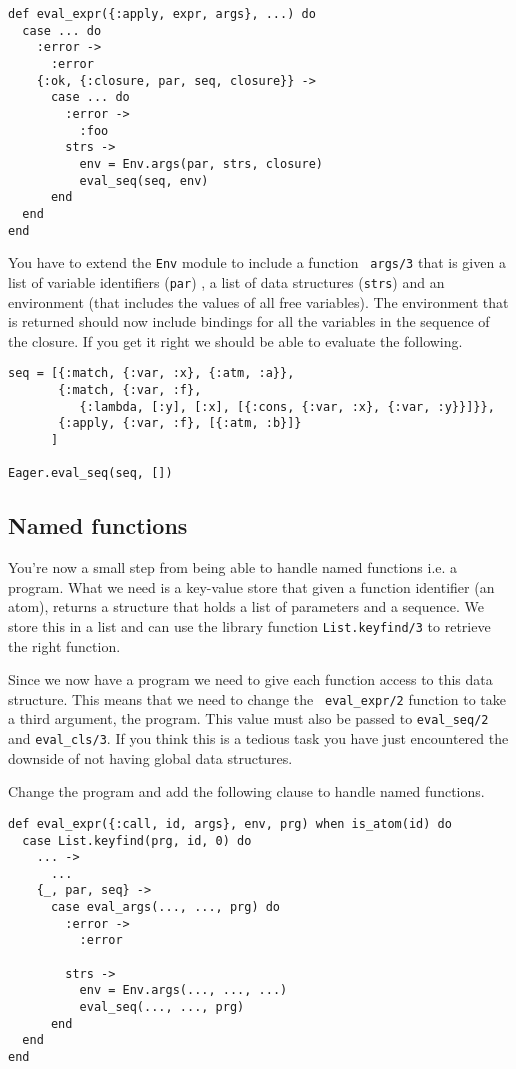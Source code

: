 \documentclass[a4paper,11pt]{article}
\begin{document}
\begin{verbatim}
def eval_expr({:apply, expr, args}, ...) do
  case ... do
    :error ->
      :error
    {:ok, {:closure, par, seq, closure}} ->
      case ... do
        :error ->
          :foo
        strs ->
          env = Env.args(par, strs, closure)
          eval_seq(seq, env)
      end
  end
end
\end{verbatim}

You have to extend the {\tt Env} module to include a function {\tt
  args/3} that is given a list of variable identifiers ({\tt par}) , a
list of data structures ({\tt strs}) and an environment (that includes
the values of all free variables). The environment that is returned
should now include bindings for all the variables in the sequence of
the closure. If you get it right we should be able to evaluate the
following.

\begin{verbatim}
seq = [{:match, {:var, :x}, {:atm, :a}},
       {:match, {:var, :f}, 
          {:lambda, [:y], [:x], [{:cons, {:var, :x}, {:var, :y}}]}},
       {:apply, {:var, :f}, [{:atm, :b}]}
      ]
      
Eager.eval_seq(seq, [])
\end{verbatim}

\subsection{Named functions}
You're now a small step from being able to handle named functions
i.e. a program. What we need is a key-value store that given a
function identifier (an atom), returns a structure that holds a list
of parameters and a sequence. We store this in a list and can use the
library function {\tt List.keyfind/3} to retrieve the right function.

Since we now have a program we need to give each function access to
this data structure. This means that we need to change the {\tt
  eval_expr/2} function to take a third argument, the program. This
value must also be passed to {\tt eval_seq/2} and {\tt eval_cls/3}. If
you think this is a tedious task you have just encountered the
downside of not having global data structures.

Change the program and add the following clause to handle named
functions.

\pagebreak

\begin{verbatim}
def eval_expr({:call, id, args}, env, prg) when is_atom(id) do
  case List.keyfind(prg, id, 0) do
    ... ->
      ...
    {_, par, seq} ->
      case eval_args(..., ..., prg) do
        :error ->
          :error

        strs ->
          env = Env.args(..., ..., ...)
          eval_seq(..., ..., prg)
      end
  end
end
\end{verbatim}
\end{document}
